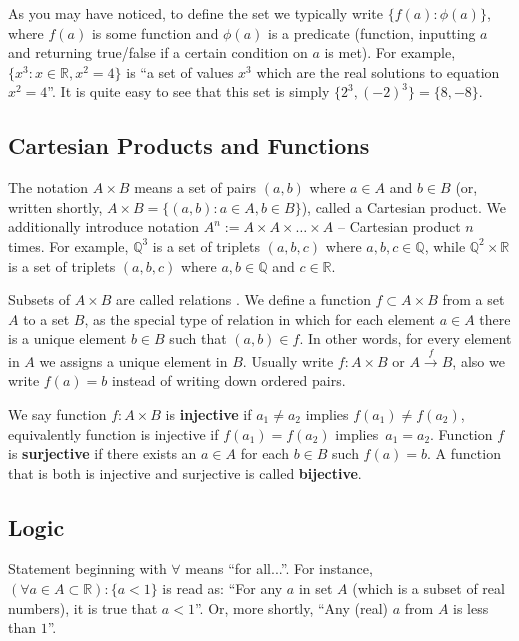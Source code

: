 \documentclass[../lecture-notes-148x210.tex]{subfiles}
\begin{document}
As you may have noticed, to define the set we typically write $\{f(a): \phi(a)\}$, where $f(a)$ is some 
function and $\phi(a)$ is a predicate (function, inputting $a$ and returning true/false if a certain condition 
on $a$ is met). For example, $\{x^3: x \in \mathbb{R}, x^2 = 4\}$ is ``a set of values $x^3$ which are the real 
solutions to equation $x^2 = 4$''. It is quite easy to see that this set is simply $\{2^3, (-2)^3\} = \{8,-8\}$. 

\subsection*{Cartesian Products and Functions}

The notation $A \times B$ means a set of pairs $(a,b)$ where $a \in A$ and $b \in B$ (or, written shortly, 
$A \times B = \{(a,b): a \in A, b \in B\}$), called a Cartesian product. We additionally introduce notation 
$A^n := A \times A \times \dots \times A$ -- Cartesian product $n$ times. For example, $\mathbb{Q}^3$ is a set of triplets 
$(a,b,c)$ where $a,b,c \in \mathbb{Q}$, while $\mathbb{Q}^2 \times \mathbb{R}$ is a set of triplets $(a,b,c)$ where 
$a,b \in \mathbb{Q}$ and $c \in \mathbb{R}$.

Subsets of $ A \times B$ are called relations \cite[section 1]{Judson_2012}. We define a function $f \subset A \times B$ from a set $A$ to a set $B$, as 
the special type of relation in which for each element $a \in A$ there is a unique element $b \in B$ such that $(a, b) \in f$.
In other words, for every element in $A$ we assigns a unique element in $B$. Usually write $f : A \times B$ or $A \xrightarrow{f} B$,
also we write $f(a) = b$ instead of writing down ordered pairs.

We say function $f : A \times B$ is \textbf{injective} if $a_1 \neq a_2$ implies $f(a_1) \neq f(a_2)$, equivalently 
function is injective if $f(a_1) = f(a_2)$ implies~$a_1 = a_2$. Function $f$ is \textbf{surjective} if there exists an $a \in A$ for
each $b \in B$ such $f(a) = b$. A function that is both is injective and surjective is called \textbf{bijective}.


\subsection*{Logic}

Statement beginning with $\forall$ means ``for all...''. For instance, $(\forall a \in A \subset \mathbb{R}): \{a < 1\}$ is 
read as: ``For any $a$ in set $A$ (which is a subset of real numbers), it is true that $a<1$''. Or, more shortly, ``Any (real) 
$a$ from $A$ is less than $1$''.
\end{document}
